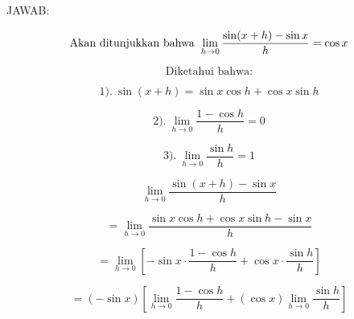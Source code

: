 \documentclass[a4paper,10pt]{article}
\begin{document}
\begin{eulernotebook}
\begin{eulercomment}
\begin{eulercomment}
\begin{eulercomment}
\begin{eulercomment}
\begin{eulercomment}
\begin{eulercomment}
\begin{eulercomment}
\begin{eulercomment}
\begin{eulercomment}
JAWAB:\\
\end{eulercomment}
\begin{eulerformula}
\[
\text{Akan ditunjukkan bahwa\: $\lim_{h\to 0} \frac{\sin(x+h)-\sin x}{h}=\cos x$}
\]
\end{eulerformula}
\begin{eulercomment}
\end{eulercomment}
\begin{eulerformula}
\[
\text{Diketahui bahwa:}
\]
\end{eulerformula}
\begin{eulercomment}
\end{eulercomment}
\begin{eulerformula}
\[
\text{$1).\: \sin(x+h)=\sin x\cos h+\cos x\sin h$}
\]
\end{eulerformula}
\begin{eulerformula}
\[
\text{$2).\: \lim_{h\to 0} \frac{1-\cos h}{h}=0$}
\]
\end{eulerformula}
\begin{eulerformula}
\[
\text{$3).\: \lim_{h\to 0} \frac{\sin h}{h}=1$}
\]
\end{eulerformula}
\begin{eulercomment}
\end{eulercomment}
\begin{eulerformula}
\[
\text{$\lim_{h\to 0} \frac{\sin(x+h)-\sin x}{h}$}
\]
\end{eulerformula}
\begin{eulercomment}
\end{eulercomment}
\begin{eulerformula}
\[
\text{$=\lim_{h\to 0} \frac{\sin x\cos h+\cos x\sin h-\sin x}{h}$}
\]
\end{eulerformula}
\begin{eulercomment}
\end{eulercomment}
\begin{eulerformula}
\[
\text{$=\lim_{h\to 0} \left[-\sin x\cdot\frac{1-\cos h}{h}+\cos x\cdot\frac{\sin h}{h}\right]$}
\]
\end{eulerformula}
\begin{eulercomment}
\end{eulercomment}
\begin{eulerformula}
\[
\text{$=(-\sin x)\left[\lim_{h\to 0} \frac{1-\cos h}{h}+(\cos x)\lim_{h\to 0} \frac{\sin h}{h}\right]$}
\]
\end{eulerformula}
\begin{eulercomment}
\end{eulercomment}

\end{eulercomment}
\end{eulercomment}
\end{eulercomment}
\end{eulercomment}
\end{eulercomment}
\end{eulercomment}
\end{eulercomment}
\end{eulercomment}
\end{eulernotebook}
\end{document}
